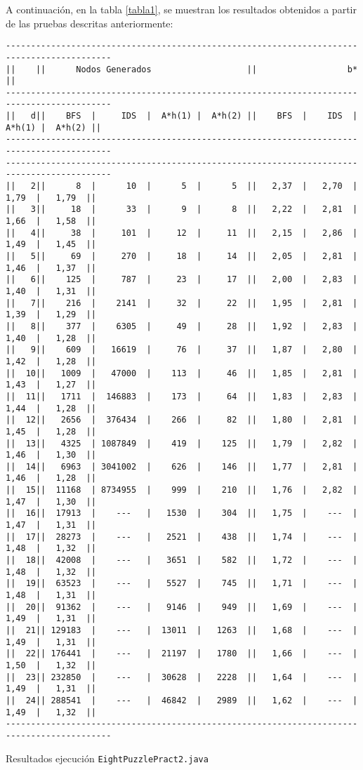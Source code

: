 \documentclass{article}
\begin{document}
A continuación, en la tabla \ref{tabla1}, se muestran los resultados obtenidos a partir de las pruebas descritas anteriormente:
\begin{table}[H]
\centering
\begin{BVerbatim}[fontsize=\footnotesize]
-------------------------------------------------------------------------------------------
||    ||      Nodos Generados                   ||                  b*                   ||
-------------------------------------------------------------------------------------------
||   d||    BFS  |     IDS  |  A*h(1) |  A*h(2) ||    BFS  |    IDS  |  A*h(1) |  A*h(2) ||
-------------------------------------------------------------------------------------------
-------------------------------------------------------------------------------------------
||   2||      8  |      10  |      5  |      5  ||   2,37  |   2,70  |   1,79  |   1,79  ||
||   3||     18  |      33  |      9  |      8  ||   2,22  |   2,81  |   1,66  |   1,58  ||
||   4||     38  |     101  |     12  |     11  ||   2,15  |   2,86  |   1,49  |   1,45  ||
||   5||     69  |     270  |     18  |     14  ||   2,05  |   2,81  |   1,46  |   1,37  ||
||   6||    125  |     787  |     23  |     17  ||   2,00  |   2,83  |   1,40  |   1,31  ||
||   7||    216  |    2141  |     32  |     22  ||   1,95  |   2,81  |   1,39  |   1,29  ||
||   8||    377  |    6305  |     49  |     28  ||   1,92  |   2,83  |   1,40  |   1,28  ||
||   9||    609  |   16619  |     76  |     37  ||   1,87  |   2,80  |   1,42  |   1,28  ||
||  10||   1009  |   47000  |    113  |     46  ||   1,85  |   2,81  |   1,43  |   1,27  ||
||  11||   1711  |  146883  |    173  |     64  ||   1,83  |   2,83  |   1,44  |   1,28  ||
||  12||   2656  |  376434  |    266  |     82  ||   1,80  |   2,81  |   1,45  |   1,28  ||
||  13||   4325  | 1087849  |    419  |    125  ||   1,79  |   2,82  |   1,46  |   1,30  ||
||  14||   6963  | 3041002  |    626  |    146  ||   1,77  |   2,81  |   1,46  |   1,28  ||
||  15||  11168  | 8734955  |    999  |    210  ||   1,76  |   2,82  |   1,47  |   1,30  ||
||  16||  17913  |    ---   |   1530  |    304  ||   1,75  |    ---  |   1,47  |   1,31  ||
||  17||  28273  |    ---   |   2521  |    438  ||   1,74  |    ---  |   1,48  |   1,32  ||
||  18||  42008  |    ---   |   3651  |    582  ||   1,72  |    ---  |   1,48  |   1,32  ||
||  19||  63523  |    ---   |   5527  |    745  ||   1,71  |    ---  |   1,48  |   1,31  ||
||  20||  91362  |    ---   |   9146  |    949  ||   1,69  |    ---  |   1,49  |   1,31  ||
||  21|| 129183  |    ---   |  13011  |   1263  ||   1,68  |    ---  |   1,49  |   1,31  ||
||  22|| 176441  |    ---   |  21197  |   1780  ||   1,66  |    ---  |   1,50  |   1,32  ||
||  23|| 232850  |    ---   |  30628  |   2228  ||   1,64  |    ---  |   1,49  |   1,31  ||
||  24|| 288541  |    ---   |  46842  |   2989  ||   1,62  |    ---  |   1,49  |   1,32  ||
-------------------------------------------------------------------------------------------

      \end{BVerbatim}
      \caption{\label{tabla1} Resultados ejecución \texttt{EightPuzzlePract2.java}}
\end{table}
\end{document}

